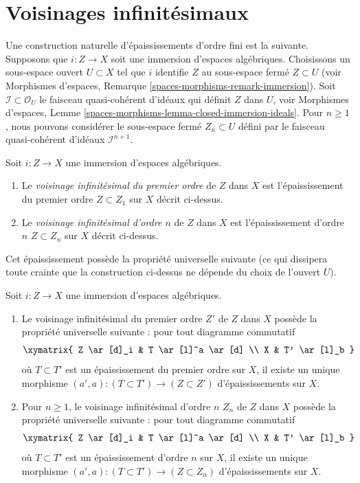 \section{Voisinages infinitésimaux}
\label{section-first-order-infinitesimal-neighbourhood}

\noindent
Une construction naturelle d'épaississements d'ordre fini est la suivante.
Supposons que $i : Z \to X$ soit une immersion d'espaces algébriques. Choisissons un
sous-espace ouvert $U \subset X$ tel que $i$ identifie $Z$ au sous-espace
fermé $Z \subset U$ (voir
Morphismes d'espaces, Remarque \ref{spaces-morphisms-remark-immersion}).
Soit $\mathcal{I} \subset \mathcal{O}_U$ le
faisceau quasi-cohérent d'idéaux qui définit $Z$ dans $U$, voir
Morphismes d'espaces,
Lemme \ref{spaces-morphisms-lemma-closed-immersion-ideals}.
Pour $n \geq 1$, nous pouvons considérer le sous-espace fermé $Z_n \subset U$
défini par le faisceau quasi-cohérent d'idéaux $\mathcal{I}^{n + 1}$.

\begin{definition}
\label{definition-first-order-infinitesimal-neighbourhood}
Soit $i : Z \to X$ une immersion d'espaces algébriques.
\begin{enumerate}
\item Le {\it voisinage infinitésimal du premier ordre} de $Z$ dans $X$ est
l'épaississement du premier ordre $Z \subset Z_1$ sur $X$ décrit ci-dessus.
\item Le {\it voisinage infinitésimal d'ordre $n$} de $Z$ dans $X$ est
l'épaississement d'ordre $n$ $Z \subset Z_n$ sur $X$ décrit ci-dessus.
\end{enumerate}
\end{definition}

\noindent
Cet épaississement possède la propriété universelle suivante (ce qui dissipera
toute crainte que la construction ci-dessus ne dépende du choix de l'ouvert
$U$).

\begin{lemma}
\label{lemma-first-order-infinitesimal-neighbourhood}
Soit $i : Z \to X$ une immersion d'espaces algébriques.
\begin{enumerate}
\item Le voisinage infinitésimal du premier ordre $Z'$ de $Z$ dans $X$
possède la propriété universelle suivante :
pour tout diagramme commutatif
$$
\xymatrix{
Z \ar[d]_i & T \ar[l]^a \ar[d] \\
X & T' \ar[l]_b
}
$$
où $T \subset T'$ est un épaississement du premier ordre sur $X$, il existe
un unique morphisme $(a', a) : (T \subset T') \to (Z \subset Z')$
d'épaississements sur $X$.
\item Pour $n \geq 1$, le voisinage infinitésimal d'ordre $n$
$Z_n$ de $Z$ dans $X$ possède la propriété universelle suivante :
pour tout diagramme commutatif
$$
\xymatrix{
Z \ar[d]_i & T \ar[l]^a \ar[d] \\
X & T' \ar[l]_b
}
$$
où $T \subset T'$ est un épaississement d'ordre $n$ sur $X$, il existe
un unique morphisme $(a', a) : (T \subset T') \to (Z \subset Z_n)$
d'épaississements sur $X$.
\end{enumerate}
\end{lemma}

